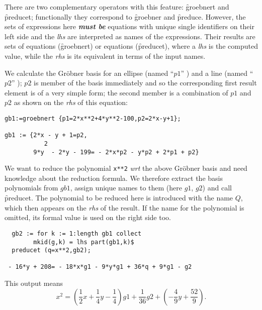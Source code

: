  
\hypertarget{operator:GROEBNERT}{}
\hypertarget{operator:PREDUCET}{}
There are two complementary operators with this feature: \f{groebnert}
and \f{preducet}; functionally they correspond to \f{groebner} and \f{preduce}.
However, the sets of expressions here \emph{\textbf{must be}} equations
with unique single identifiers on their left side and the \textit{lhs} are
interpreted as names of the expressions. Their results are
sets of equations (\f{groebnert}) or equations (\f{preducet}), where
a \textit{lhs} is the computed value, while the \textit{rhs} is its equivalent
in terms of the input names.

\example {}

We calculate the Gr\"obner basis for an ellipse (named ``$p1$'' ) and a
line (named ``$p2$'' ); $p2$ is member of the basis immediately and so
the corresponding first result element is of a very simple form; the
second member is a combination of $p1$ and $p2$ as shown on the
\textit{rhs} of this equation:

\begin{verbatim}
gb1:=groebnert {p1=2*x**2+4*y**2-100,p2=2*x-y+1};

gb1 := {2*x - y + 1=p2,
           2
        9*y  - 2*y - 199= - 2*x*p2 - y*p2 + 2*p1 + p2}
\end{verbatim}

\example {}

We want to reduce the polynomial \texttt{x**2} \emph{wrt}
the above Gr\"obner basis and need knowledge about the reduction
formula. We therefore extract the basis polynomials from $gb1$,
assign unique names to them (here $g1$, $g2$) and call \f{preducet}.
The polynomial to be reduced here is introduced with the name $Q$,
which then appears on the \textit{rhs} of the result. If the name for the
polynomial is omitted, its formal value is used on the right side too.

\begin{verbatim}
  gb2 := for k := 1:length gb1 collect
        mkid(g,k) = lhs part(gb1,k)$
  preducet (q=x**2,gb2);

 - 16*y + 208= - 18*x*g1 - 9*y*g1 + 36*q + 9*g1 - g2
\end{verbatim}

This output means
\[
x^2 = (\frac{1}{2} x + \frac{1}{4} y - \frac{1}{4}) g1
 + \frac{1}{36} g2 + (-\frac{4}{9} y + \frac{52}{9}).
\]


